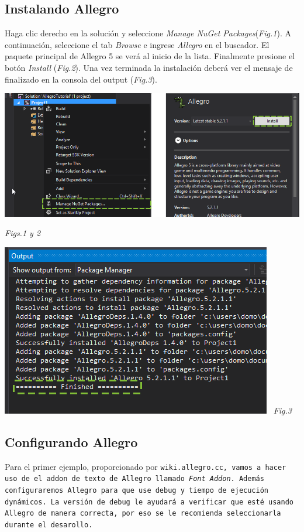 \documentclass[11pt]{article}
\begin{document}
\subsection{Instalando Allegro}
Haga clic derecho en la solución y seleccione \emph{Manage NuGet Packages}(\emph{Fig.1}). A continuación, seleccione el tab \emph{Browse} e ingrese \emph{Allegro} en el buscador. El paquete principal de Allegro 5 se verá al inicio de la lista. Finalmente presione el botón \emph{Install} (\emph{Fig.2}). Una vez terminada la instalación deberá ver el mensaje de finalizado en la consola del output (\emph{Fig.3}).
\begin{center}
\includegraphics[scale=0.5]{SC23.png}

\emph{Figs.1 y 2}

\includegraphics[scale=0.6]{SC4.png}
\ \emph{Fig.3}
\end{center}

\subsection{Configurando Allegro}
Para el primer ejemplo, proporcionado por \tt wiki.allegro.cc\rm , vamos a hacer uso de el addon de texto de Allegro llamado \emph{Font Addon}. Además configuraremos Allegro para que use debug y tiempo de ejecución dynámicos. La versión de debug le ayudará a verificar que esté usando Allegro de manera correcta, por eso se le recomienda seleccionarla durante el desarollo.
\end{document}
